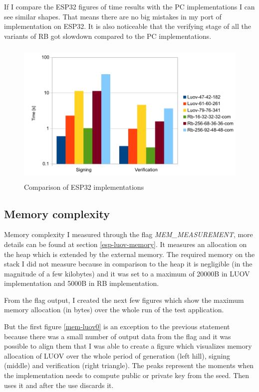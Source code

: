 \documentclass[thesis=M,english]{FITthesis}[2019/12/23]
\begin{document}
\bigskip
\noindent
If I compare the ESP32 figures of time results with the PC implementations I can see similar shapes. That means there are no big mistakes in my port of implementation on ESP32. It is also noticeable that the verifying stage of all the variants of RB got slowdown compared to the PC implementations.

\begin{figure}[H]
\centering
\includegraphics[width=13cm,height=7cm]{images/time-both.pdf}
\caption{Comparison of ESP32 implementations}
\label{time-both}
\end{figure}

\subsection{Memory complexity}
Memory complexity I measured through the flag \textit{MEM\_MEASUREMENT}, more details can be found at section \ref{esp-luov-memory}. It measures an allocation on the heap which is extended by the external memory. The required memory on the stack I did not measure because in comparison to the heap it is negligible (in the magnitude of a few kilobytes) and it was set to a maximum of 20000B in LUOV implementation and 5000B in RB implementation.

\bigskip
\noindent
From the flag output, I created the next few figures which show the maximum memory allocation (in bytes) over the whole run of the test application.

\bigskip
\noindent
But the first figure \ref{mem-luov0} is an exception to the previous statement because there was a small number of output data from the flag and it was possible to align them that I was able to create a figure which visualizes memory allocation of LUOV over the whole period of generation (left hill), signing (middle) and verification (right triangle). The peaks represent the moments when the implementation needs to compute public or private key from the seed. Then uses it and after the use discards it.
\end{document}

